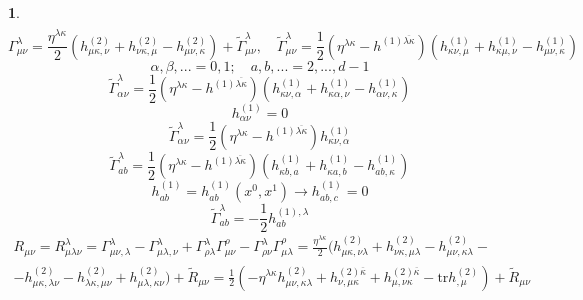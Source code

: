 \documentclass[12pt]{article}
\theoremstyle{definition}
\newtheorem{zad}{}[section]
\begin{document}
\begin{zad}
\begin{multline}
\end{multline}
\begin{equation}
    \boxed{\Gamma_{\mu\nu}^\lambda=\frac{\eta^{\lambda\kappa}}{2}(h^{(2)}_{\mu\kappa,\nu}+h^{(2)}_{\nu\kappa,\mu}-h^{(2)}_{\mu\nu,\kappa})+\tilde\Gamma^\lambda_{\mu\nu},\quad \tilde\Gamma^\lambda_{\mu\nu}=\frac{1}{2}(\eta^{\lambda\kappa}-h^{(1)\overline{\lambda\kappa}})(h^{(1)}_{\kappa\nu,\mu}+h^{(1)}_{\kappa\mu,\nu}-h^{(1)}_{\mu\nu,\kappa})}
\end{equation}
\begin{equation}
    \alpha,\beta,... =0,1;\quad a,b,...=2,...,d-1
\end{equation}
\begin{equation}
    \tilde\Gamma^\lambda_{\alpha\nu}=\frac{1}{2}(\eta^{\lambda\kappa}-h^{(1)\overline{\lambda\kappa}})(h^{(1)}_{\kappa\nu,\alpha}+h^{(1)}_{\kappa\alpha,\nu}-h^{(1)}_{\alpha\nu,\kappa})
\end{equation}
\begin{equation}
    h^{(1)}_{\alpha\nu}=0
\end{equation}
\begin{equation}
    \boxed{\tilde\Gamma^\lambda_{\alpha\nu}=\frac{1}{2}(\eta^{\lambda\kappa}-h^{(1)\overline{\lambda\kappa}})h^{(1)}_{\kappa\nu,\alpha}}
\end{equation}
\begin{equation}
    \tilde\Gamma^\lambda_{ab}=\frac{1}{2}(\eta^{\lambda\kappa}-h^{(1)\overline{\lambda\kappa}})(h^{(1)}_{\kappa b,a}+h^{(1)}_{\kappa a,b}-h^{(1)}_{ab,\kappa})
\end{equation}
\begin{equation}\label{eq9}
    h^{(1)}_{ab}=h^{(1)}_{ab}(x^0,x^1)\rightarrow h^{(1)}_{ab,c}=0
\end{equation}
\begin{equation}
    \boxed{\tilde\Gamma^\lambda_{ab}=-\frac{1}{2}h^{(1),\lambda}_{ab}}
\end{equation}
\begin{multline}
    R_{\mu\nu}=R^\lambda_{\mu\lambda\nu}=\Gamma^\lambda_{\mu\nu,\lambda}-\Gamma^\lambda_{\mu\lambda,\nu}+\Gamma^\lambda_{\rho\lambda}\Gamma^\rho_{\mu\nu}-\Gamma^\lambda_{\rho\nu}\Gamma^\rho_{\mu\lambda}=\frac{\eta^{\lambda\kappa}}{2}(h^{(2)}_{\mu\kappa,\nu\lambda}+h^{(2)}_{\nu\kappa,\mu\lambda}-h^{(2)}_{\mu\nu,\kappa\lambda}-\\-h^{(2)}_{\mu\kappa,\lambda\nu}-h^{(2)}_{\lambda\kappa,\mu\nu}+h^{(2)}_{\mu\lambda,\kappa\nu})+\tilde R_{\mu\nu}=\frac{1}{2}(-\eta^{\lambda\kappa}h^{(2)}_{\mu\nu,\kappa\lambda}+h^{(2)\overline{\kappa}}_{\nu,\mu\kappa}+h^{(2)\overline{\kappa}}_{\mu,\nu\kappa}-\text{tr}h^{(2)}_{,\mu})+\tilde R_{\mu\nu}

\end{multline}
\end{zad}
\end{document}
